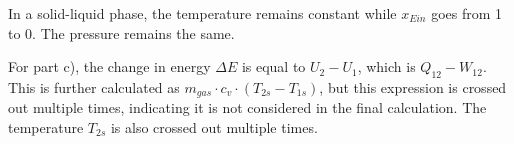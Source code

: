 In a solid-liquid phase, the temperature remains constant while \( x_{Ein} \) goes from 1 to 0. The pressure remains the same.

For part c), the change in energy \( \Delta E \) is equal to \( U_2 - U_1 \), which is \( Q_{12} - W_{12} \). This is further calculated as \( m_{gas} \cdot c_v \cdot (T_{2s} - T_{1s}) \), but this expression is crossed out multiple times, indicating it is not considered in the final calculation. The temperature \( T_{2s} \) is also crossed out multiple times.